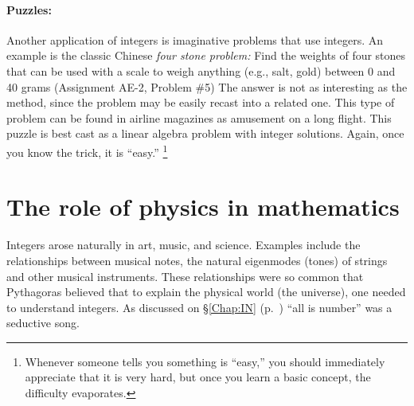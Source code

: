 \documentclass{ximera}
\begin{document}
 \paragraph{Puzzles:}
\label{puzzle}
Another application of integers is imaginative problems that use integers. An example is the classic
Chinese \emph{four stone problem:}
Find the weights of four stones that can be used with a scale to weigh anything (e.g., salt, gold) between
0 and 40 grams (Assignment AE-2, Problem \#5)  %
The answer is not as interesting as the method, since the problem may be easily recast into a related one.
This type of problem can be found in airline magazines as amusement on a long flight. This puzzle is best
cast as a linear algebra problem with integer solutions. Again, once you know the trick, it is ``easy.''%
 \footnote{Whenever someone tells you something is ``easy,'' you should immediately appreciate that
 it is very hard, but once you learn a basic concept, the difficulty evaporates.}
 


	{%
\newpage
 \renewcommand{\sol}[1]{} %



\newpage
\renewcommand{\sol}[1]{ {\\blue{\bf Solution:~}#1}{\gray\tiny$\blacksquare$} }
	}%


\section[The role of physics in mathematics]
	{The role of physics in mathematics \label{Lec 3}}

Integers arose naturally in art, music, and science. Examples include the relationships between musical notes,
the natural eigenmodes (tones) of strings and other musical instruments.  These relationships were so common
that Pythagoras believed that to explain the physical world (the universe), one needed
to understand integers.  As discussed on \S\ref{Chap:IN} (p.~\pageref{Chap:IN}) ``all is number'' was a seductive song.
\end{document}
